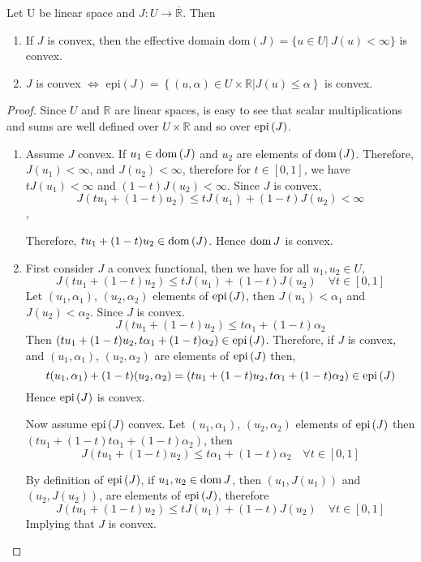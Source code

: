 \begin{lemma}
	Let U be linear space and $J: U\rightarrow \overline{\mathbb{R}}$. Then
	\begin{enumerate}
		\item If $J$ is convex, then the effective domain $\mathrm{dom}(J)=\lbrace u\in U | \ J(u) < \infty\rbrace $ is convex.
		\item $J$ is convex $\iff$ $\mathrm{epi}(J)=\left\lbrace (u,\alpha) \in U\times \mathbb{R} | J(u)\leq \alpha\right\rbrace$ is convex.
	\end{enumerate}
	\begin{proof} Since $U$ and $\mathbb{R}$ are linear spaces, is easy to see that scalar multiplications and sums are well defined over $U\times \mathbb{R}$ and so over $\mathrm{epi\,}(J)$.
		\begin{enumerate}
			\item Assume $J$ convex. If $u_1\in \mathrm{dom\,} (J)$ and $u_2$ are elements of $\mathrm{dom\,} (J)$. Therefore, $J(u_1)<\infty$, and $J(u_2)<\infty$, therefore for $t \in [0,1]$, we have $tJ(u_1)<\infty$ and $(1-t)J(u_2)<\infty$. Since $J$ is convex, 
			\[J(t u_1 + (1-t)u_2)\leq tJ(u_1)	+(1-t)J(u_2) < \infty\],
			
			Therefore, $tu_1 +(1-t)u_2 \in \mathrm{dom\,} (J)$. Hence $\mathrm{dom\,} J$ is convex.
			\item First consider $J$ a convex functional, then we have for all $u_1, u_2 \in U$,
				\[
					J(t u_1 + (1-t)u_2)\leq tJ(u_1)	+(1-t)J(u_2) \quad \forall t \in [0,1]
				\]
				Let $(u_1, \alpha_1)$, $(u_2, \alpha_2)$ elements of $\mathrm{epi\,}(J)$, then $J(u_1) < \alpha_1$ and $J(u_2)< \alpha_2$. Since $J$ is convex. 
				\[
					J(t u_1 + (1-t)u_2) \leq t \alpha_1 + (1-t)\alpha_2
				\]
				Then $(tu_1+(1-t)u_2, t \alpha_1+(1-t)\alpha_2) \in \mathrm{epi\,}(J)$. Therefore, if $J$ is convex, and $(u_1, \alpha_1)$, $(u_2, \alpha_2)$ are elements of $\mathrm{epi\,}(J)$ then,
				\[ t(u_1,\alpha_1)+(1-t)(u_2, \alpha_2)=(tu_1+(1-t)u_2, t \alpha_1+(1-t)\alpha_2) \in \mathrm{epi\,}(J) \]
				Hence $\mathrm{epi\,}(J)$ is convex. 
				
				Now assume $\mathrm{epi\,}(J)$ convex. Let $(u_1, \alpha_1)$, $(u_2, \alpha_2)$ elements of $\mathrm{epi\,}(J)$ then $(tu_1+(1-t)t \alpha_1 + (1-t)\alpha_2) $, then
				\[
							J(t u_1 + (1-t)u_2) \leq t \alpha_1 + (1-t)\alpha_2 \quad \forall t \in [0,1]
				\]
				
				By definition of $\mathrm{epi\,}(J)$, if $u_1, u_2 \in \mathrm{dom\,} J$, then $(u_1, J(u_1))$ and $(u_2, J(u_2))$, are elements of $\mathrm{epi\,}(J)$, therefore
				\[
					J(t u_1 + (1-t)u_2) \leq t J(u_1) + (1-t)J(u_2) \quad \forall t \in [0,1]
				\]
				Implying that $J$ is convex.
		\end{enumerate}
	\end{proof}
\end{lemma}

\begin{definition}
	
\end{definition}

